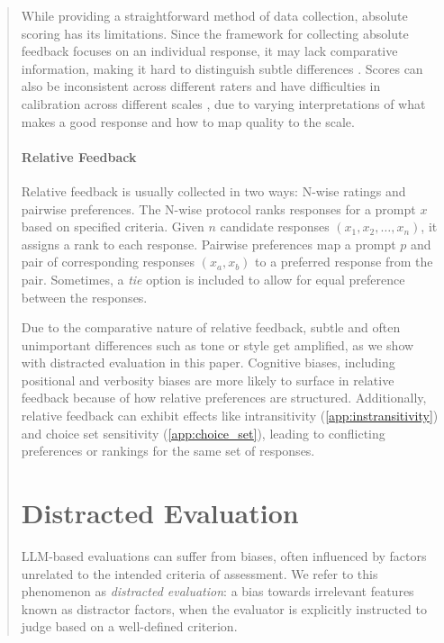 \documentclass{article}
\begin{document}
\begin{abstract}
While providing a straightforward method of data collection, absolute scoring has its limitations. Since the framework for collecting absolute feedback focuses on an individual response, it may lack comparative information, making it hard to distinguish subtle differences \citep{zheng2023judgingllmasajudgemtbenchchatbot}. Scores can also be inconsistent across different raters and have difficulties in calibration across different scales \citep{Zwislocki1983-uz}, due to varying interpretations of what makes a good response and how to map quality to the scale.

\paragraph{Relative Feedback} Relative feedback is usually collected in two ways: N-wise ratings and pairwise preferences. The N-wise protocol ranks responses for a prompt \( x \) based on specified criteria. Given \( n \) candidate responses \((x_1, x_2, \dots, x_n) \), it assigns a rank to each response. Pairwise preferences map a prompt \( p \) and pair of corresponding responses \( (x_a, x_b) \) to a preferred response from the pair. Sometimes, a \textit{tie} option is included to allow for equal preference between the responses. 

Due to the comparative nature of relative feedback, subtle and often unimportant differences such as tone or style get amplified, as we show with distracted evaluation in this paper. Cognitive biases, including positional and verbosity biases \citep{saito2023verbositybiaspreferencelabeling, wang2023large, wu2023style} are more likely to surface in relative feedback because of how relative preferences are structured. Additionally, relative feedback can exhibit effects like intransitivity (\ref{app:instransitivity}) and choice set sensitivity (\ref{app:choice_set}), leading to conflicting preferences or rankings for the same set of responses.

\section{Distracted Evaluation}
\label{sec:distract_eval}
LLM-based evaluations can suffer from biases, often influenced by factors unrelated to the intended criteria of assessment. We refer to this phenomenon as \emph{distracted evaluation}: a bias towards irrelevant features known as distractor factors, when the evaluator is explicitly instructed to judge based on a well-defined criterion. 


\end{abstract}
\end{document}
